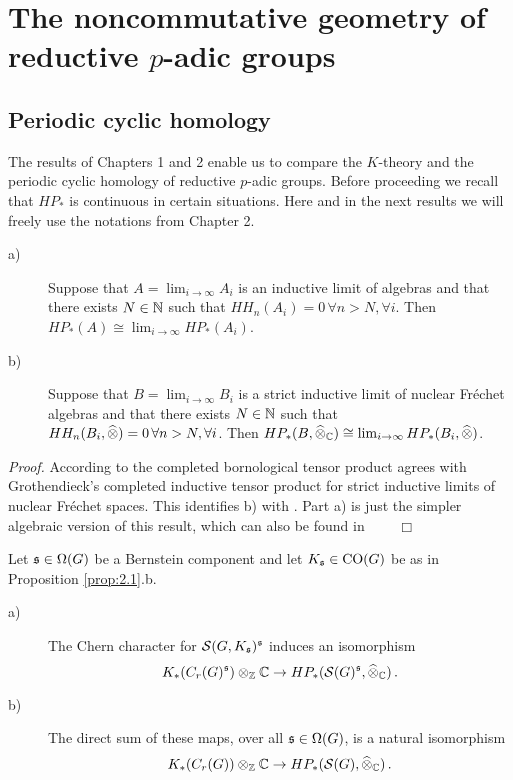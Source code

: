\chapter{The noncommutative geometry of reductive $p$-adic groups}

\section{Periodic cyclic homology}
\label{sec:3.1}


The results of Chapters 1 and 2 enable us to compare the $K$-theory and
the periodic cyclic homology of reductive $p$-adic groups. Before 
proceeding we recall that $HP_*$ is continuous in certain situations.
Here and in the next results we will freely use the notations from Chapter 2.

\begin{thm}\label{thm:3.1}
\begin{description}
\item[a)] Suppose that $A = \lim_{i \to \infty} A_i$ is an inductive limit of algebras
and that there exists $N \in \mathbb N$ such that $HH_n (A_i ) = 0 \, \forall n > N , 
\forall i$. Then $HP_* (A) \cong \lim_{i \to \infty} HP_* (A_i )$.
\item[b)] Suppose that  $B = \lim_{i \to \infty} B_i$ is a strict inductive limit of nuclear
Fr\'echet algebras and that there exists $N \in \mathbb N$ such that 
$HH_n (B_i ,\widehat{\otimes} ) = 0 \, \forall n > N , \forall i$. 
Then $HP_* (B ,\widehat{\otimes}_{\mathbb C} ) \cong \lim_{i \to \infty} HP_* (B_i ,\widehat{\otimes})$.
\end{description}
\end{thm}
\emph{Proof.}
According to \cite[Theorem 1.93]{Mey3} the completed bornological tensor product
agrees with Grothendieck's completed inductive tensor product for strict inductive limits 
of nuclear Fr\'echet spaces. This identifies b) with \cite[Theorem 3]{BrPl1}.
Part a) is just the simpler algebraic version of this result, which can also be found in
\cite[Proposition 2.2]{Nis} $\qquad \Box$
\\[2mm]
\begin{thm}\label{thm:3.2}
Let $\mathfrak s \in \Omega (G)$ be a Bernstein component and let $K_{\mathfrak s} \in \mathrm{CO}(G)$
be as in Proposition \textup{\ref{prop:2.1}.b.}
\begin{description}
\item[a)] The Chern character for $\mathcal S (G,K_{\mathfrak s} )^{\mathfrak s}$ induces an isomorphism
\[
K_* (C_r (G)^{\mathfrak s} ) \otimes_{\mathbb Z} \mathbb C \to HP_* (\mathcal S (G)^{\mathfrak s} ,\widehat{\otimes}_{\mathbb C} ) \,.
\]
\item[b)] The direct sum of these maps, over all $\mathfrak s \in \Omega (G)$, 
is a natural isomorphism
\[
K_* (C_r (G)) \otimes_{\mathbb Z} \mathbb C \to HP_* (\mathcal S (G),\widehat{\otimes}_{\mathbb C} ) \,.
\]
\end{description}
\end{thm}
